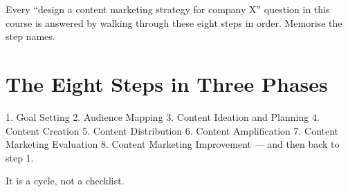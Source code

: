\documentclass{MMTextbook}
\begin{document}
\begin{keybox}
Every ``design a content marketing strategy for company X'' question in this
course is answered by walking through these eight steps in order. Memorise the
step names.
\end{keybox}

\section{The Eight Steps in Three Phases}

\begin{frameworkbox}
1. Goal Setting \ra{} 2. Audience Mapping \ra{} 3. Content Ideation and
Planning \ra{} 4. Content Creation \ra{} 5. Content Distribution \ra{}
6. Content Amplification \ra{} 7. Content Marketing Evaluation \ra{}
8. Content Marketing Improvement --- and then back to step 1.

\smallskip
It is a cycle, not a checklist.
\end{frameworkbox}
\end{document}
